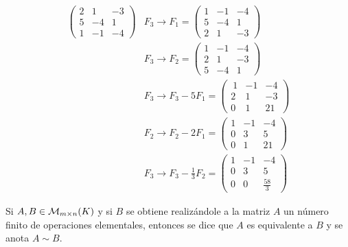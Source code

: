 \begin{ejem}
\begin{align*}
     \begin{pmatrix}  2 & 1 & -3  \\ 5  & -4 & 1  \\ 1 & -1 & -4  \end{pmatrix} & F_3 \rightarrow F_1 = \begin{pmatrix}  1 & -1 & -4  \\ 5  & -4 & 1  \\ 2 & 1 & -3 \end{pmatrix} \\
     & F_3 \rightarrow F_2 =  \begin{pmatrix}  1 & -1 & -4  \\ 2 & 1 & -3  \\ 5  & -4 & 1  \end{pmatrix} \\
     &F_3 \rightarrow F_3 - 5F_1 = \begin{pmatrix} \ 1 & -1 & -4  \\ 2 & 1 & -3 \\  0 & 1 & 21  \end{pmatrix} \\
     &F_2 \rightarrow F_2 - 2F_1 = \begin{pmatrix}  1 & -1 & -4  \\ 0 & 3 & 5  \\  0 & 1 & 21  \end{pmatrix} \\
     &F_3 \rightarrow F_3 - \frac{1}{3} F_2 = \begin{pmatrix}  1 & -1 & -4  \\ 0 & 3 & 5  \\  0 & 0 & \frac{58}{3}  \end{pmatrix}
\end{align*}

\end{ejem}


\begin{defin}
Si $A, B \in \mathcal{M}_{m\times n}(K)$ y si $B$ se obtiene realizándole a la matriz $A$ un número finito de operaciones
elementales, entonces se dice que $A$ es equivalente a $B$ y se anota $A \sim B$.
\end{defin}


